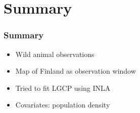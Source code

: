 \documentclass[t]{beamer}
\begin{document}

\section{Summary}

\begin{frame}
\frametitle{Summary}

\begin{itemize}
  \item Wild animal observations
  \item Map of Finland as observation window
  \item Tried to fit LGCP using INLA
  \item Covariates: population density  
\end{itemize}

\end{frame}
\end{document}
